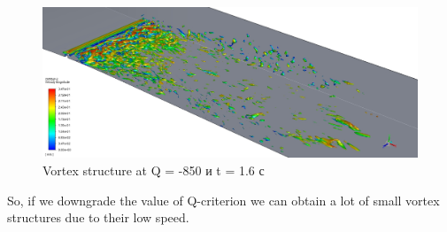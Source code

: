 	\begin{figure}[H]
		\centering
		\includegraphics[width=1\linewidth]{../Assets/QM850-t16}
		\caption{Vortex structure at Q = -850 и t = 1.6 с}
		\label{fig:qm850-t16}
	\end{figure}
	So, if we downgrade the value of Q-criterion we can obtain a lot of small vortex structures due to their low speed.
	\nocite{KimW.W.1995,Agostini2014,Blackwelder1983,Abbas2017}